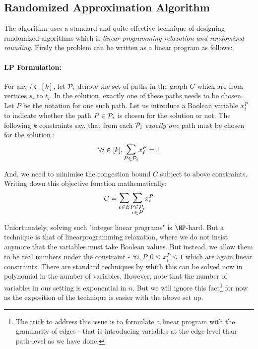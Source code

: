 \subsection{Randomized Approximation Algorithm}

The algorithm uses a standard and quite effective technique of designing randomized algorithms which is {\em linear programming relaxation and randomized rounding}. Firsly the problem can be written as a linear program as follows: \\[-10mm]

\paragraph*{LP Formulation:} For any $i \in [k]$, let ${\cal P}_i$ denote the set of paths in the graph $G$ which are from vertices $s_i$ to $t_i$. In the solution, exactly one of these paths needs to be chosen. Let $P$ be the notation for one such path. Let us introduce a Boolean variable $x_i^P$ to indicate whether the path $P \in {\cal P}_i$ is chosen for the solution or not. The following $k$ constraints say, that from each ${\cal P}_i$ \textit{exactly one} path must be chosen for the solution : 
\begin{equation}
\forall i \in [k], \bigsum_{P \in {\cal P}_i} x_I^P = 1
\label{lp-const1}
\end{equation}

And, we need to minimise the congestion bound $C$ subject to above constraints. Writing down this objective function mathematically:
\begin{equation}
C = \bigsum_{e \in E} \bigsum_{\substack{P \in {\cal P}_i \\ e \in P}}x_i^P
\end{equation}

Unfortunately, solving such "integer linear programs" is $\NP$-hard. But a technique is that of linearprogramming relaxation, where we do not insist anymore that the variables must take Boolean values. But instead, we allow them to be real numbers under the constraint -  $\forall i, P, 0 \le x_i^P \le 1$ which are again linear constraints. There are standard techniques by which this can be solved now in polynomial in the number of variables. However, note that the number of variables in our setting is exponential in $n$. But we will ignore this fact\footnote{The trick to address this issue is to formulate a linear program with the granularity of edges - that is introducing variables at the edge-level than path-level as we have done.} for now as the exposition of the technique is easier with the above set up.

